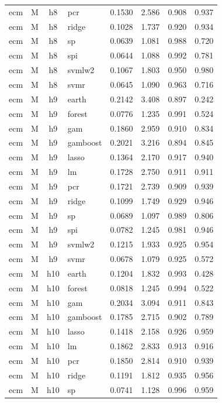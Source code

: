 \begin{ThreePartTable}
\begin{longtable}[t]{llclcccc}
ecm & M & h8 & pcr & 0.1530 & 2.586 & 0.908 & 0.937\\
ecm & M & h8 & ridge & 0.1028 & 1.737 & 0.920 & 0.934\\
ecm & M & h8 & sp & 0.0639 & 1.081 & 0.988 & 0.720\\
ecm & M & h8 & spi & 0.0644 & 1.088 & 0.992 & 0.781\\
ecm & M & h8 & svmlw2 & 0.1067 & 1.803 & 0.950 & 0.980\\
ecm & M & h8 & svmr & 0.0645 & 1.090 & 0.963 & 0.716\\
\addlinespace
ecm & M & h9 & earth & 0.2142 & 3.408 & 0.897 & 0.242\\
ecm & M & h9 & forest & 0.0776 & 1.235 & 0.991 & 0.524\\
ecm & M & h9 & gam & 0.1860 & 2.959 & 0.910 & 0.834\\
ecm & M & h9 & gamboost & 0.2021 & 3.216 & 0.894 & 0.845\\
ecm & M & h9 & lasso & 0.1364 & 2.170 & 0.917 & 0.940\\
ecm & M & h9 & lm & 0.1728 & 2.750 & 0.911 & 0.911\\
ecm & M & h9 & pcr & 0.1721 & 2.739 & 0.909 & 0.939\\
ecm & M & h9 & ridge & 0.1099 & 1.749 & 0.929 & 0.946\\
ecm & M & h9 & sp & 0.0689 & 1.097 & 0.989 & 0.806\\
ecm & M & h9 & spi & 0.0782 & 1.245 & 0.981 & 0.946\\
ecm & M & h9 & svmlw2 & 0.1215 & 1.933 & 0.925 & 0.954\\
ecm & M & h9 & svmr & 0.0678 & 1.079 & 0.925 & 0.572\\
\addlinespace
ecm & M & h10 & earth & 0.1204 & 1.832 & 0.993 & 0.428\\
ecm & M & h10 & forest & 0.0818 & 1.245 & 0.994 & 0.522\\
ecm & M & h10 & gam & 0.2034 & 3.094 & 0.911 & 0.843\\
ecm & M & h10 & gamboost & 0.1785 & 2.715 & 0.902 & 0.789\\
ecm & M & h10 & lasso & 0.1418 & 2.158 & 0.926 & 0.959\\
ecm & M & h10 & lm & 0.1862 & 2.833 & 0.913 & 0.916\\
ecm & M & h10 & pcr & 0.1850 & 2.814 & 0.910 & 0.939\\
ecm & M & h10 & ridge & 0.1191 & 1.812 & 0.935 & 0.956\\
ecm & M & h10 & sp & 0.0741 & 1.128 & 0.996 & 0.959\\

\end{longtable}
\end{ThreePartTable}

